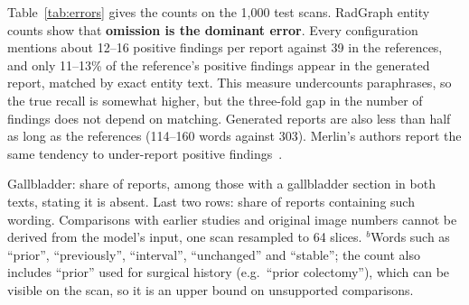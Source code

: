 \documentclass[conference]{IEEEtran}
\begin{document}
Table~\ref{tab:errors} gives the counts on the 1,000 test scans. RadGraph
entity counts show that \textbf{omission is the dominant error}. Every
configuration mentions about 12--16 positive findings per report against 39
in the references, and only 11--13\% of the reference's positive findings
appear in the generated report, matched by exact entity text. This measure
undercounts paraphrases, so the true recall is somewhat higher, but the
three-fold gap in the number of findings does not depend on matching.
Generated reports are also less than half as long as the references (114--160
words against 303). Merlin's authors report the same tendency to under-report
positive findings~\cite{merlin}.

\begin{table}[t]
\centering
\caption{Error analysis on 1,000 test scans. Findings are RadGraph
observation entities; precision and recall use exact-text matching and are
approximate.}
\label{tab:errors}
\footnotesize
\setlength{\tabcolsep}{2.5pt}

\vspace{2pt}
\parbox{\columnwidth}{\scriptsize Gallbladder: share of reports, among those
with a gallbladder section in both texts, stating it is absent. Last two
rows: share of reports containing such wording. Comparisons with earlier
studies and original image numbers cannot be derived from the model's input,
one scan resampled to 64 slices. $^{b}$Words such as ``prior'', ``previously'',
``interval'', ``unchanged'' and ``stable''; the count also includes ``prior''
used for surgical history (e.g.\ ``prior colectomy''), which can be visible
on the scan, so it is an upper bound on unsupported comparisons.}
\end{table}
\end{document}
